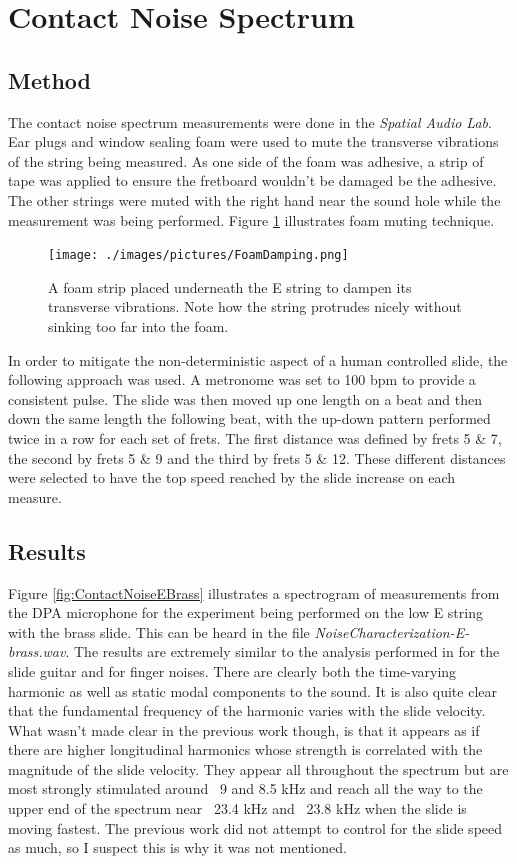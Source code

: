 \documentclass[../main.tex]{subfiles}
\begin{document}
\section{Contact Noise Spectrum}
\subsection{Method}
The contact noise spectrum measurements were done in the \emph{Spatial Audio Lab}. Ear plugs and window sealing foam were used to mute the transverse vibrations of the string being measured. As one side of the foam was adhesive, a strip of tape was applied to ensure the fretboard wouldn't be damaged be the adhesive. The other strings were muted with the right hand near the sound hole while the measurement was being performed. Figure \ref{fig:FoamStrip} illustrates foam muting technique.

\begin{figure}[h]
    \centering
    \texttt{[image: ./images/pictures/FoamDamping.png]}
    \caption{A foam strip placed underneath the E string to dampen its transverse vibrations. Note how the string protrudes nicely without sinking too far into the foam.}
    \label{fig:FoamStrip}
\end{figure}

In order to mitigate the non-deterministic aspect of a human controlled slide, the following approach was used. A metronome was set to 100 bpm to provide a consistent pulse. The slide was then moved up one length on a beat and then down the same length the following beat, with the up-down pattern performed twice in a row for each set of frets. The first distance was defined by frets 5 \& 7, the second by frets 5 \& 9 and the third by frets 5 \& 12. These different distances were selected to have the top speed reached by the slide increase on each measure.

\subsection{Results}
Figure \ref{fig:ContactNoiseEBrass} illustrates a spectrogram of  measurements from the DPA microphone for the experiment being performed on the low E string with the brass slide. This can be heard in the file \emph{NoiseCharacterization-E-brass.wav}. The results are extremely similar to the analysis performed in  for the slide guitar and  for finger noises. There are clearly both the time-varying harmonic as well as static modal components to the sound. It is also quite clear that the fundamental frequency of the harmonic varies with the slide velocity. What wasn't made clear in the previous work though, is that it appears as if there are higher longitudinal harmonics whose strength is correlated with the magnitude of the slide velocity. They appear all throughout the spectrum but are most strongly stimulated around ~9 and 8.5 kHz and reach all the way to the upper end of the spectrum near ~23.4 kHz and ~23.8 kHz when the slide is moving fastest. The previous work did not attempt to control for the slide speed as much, so I suspect this is why it was not mentioned.
\end{document}

